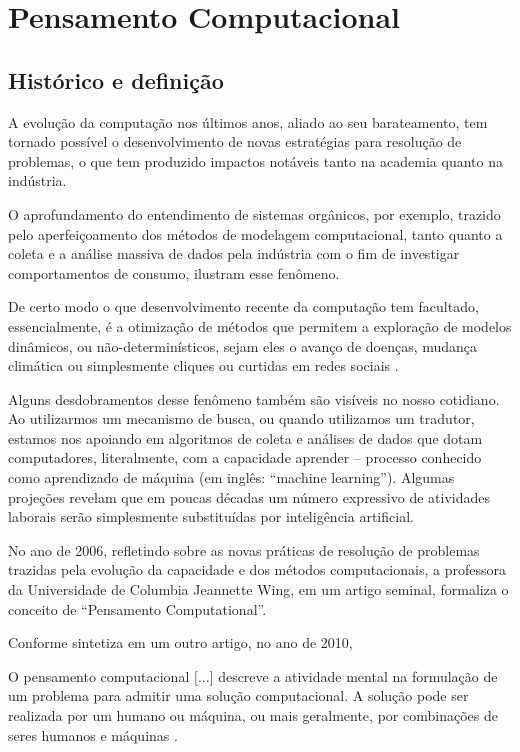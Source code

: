 \chapter{Pensamento Computacional}\label{pensamento-computacional}


\section{Histórico e definição}

A evolução da computação nos últimos anos, aliado ao seu barateamento, tem tornado possível o desenvolvimento de novas estratégias para resolução de problemas, o que tem produzido impactos notáveis tanto na academia quanto na indústria.

O aprofundamento do entendimento de sistemas orgânicos, por exemplo, trazido pelo aperfeiçoamento dos métodos de modelagem computacional, tanto quanto a coleta e a análise massiva de dados pela indústria com o fim de investigar comportamentos de consumo, ilustram esse fenômeno.

De certo modo o que desenvolvimento recente da computação tem facultado, essencialmente, é a otimização de métodos que permitem a exploração de modelos dinâmicos, ou não-determinísticos, sejam eles o avanço de doenças, mudança climática ou simplesmente cliques ou curtidas em redes sociais \cite{weintrop}.

Alguns desdobramentos desse fenômeno também são visíveis no nosso cotidiano. Ao utilizarmos um mecanismo de busca, ou quando utilizamos um tradutor, estamos nos apoiando em algoritmos de coleta e análises de dados que dotam computadores, literalmente, com a capacidade aprender -- processo conhecido como aprendizado de máquina (em inglês: ``machine learning''). Algumas projeções revelam que em poucas décadas um número expressivo de atividades laborais serão simplesmente substituídas por inteligência artificial. 

No ano de 2006, refletindo sobre as novas práticas de resolução de problemas trazidas pela evolução da capacidade e dos métodos computacionais, a professora da Universidade de Columbia Jeannette Wing, em um artigo seminal, formaliza o conceito de ``Pensamento Computational''. 


Conforme sintetiza em um outro artigo, no ano de 2010,

\begin{citacao}
  O pensamento computacional $[$...$]$ descreve a atividade mental na formulação de um problema para admitir 
uma solução computacional. A solução pode ser realizada por um humano ou máquina, 
ou mais geralmente, por combinações de seres humanos e máquinas \cite[tradução nossa]{Wing2010}.
\end{citacao}





